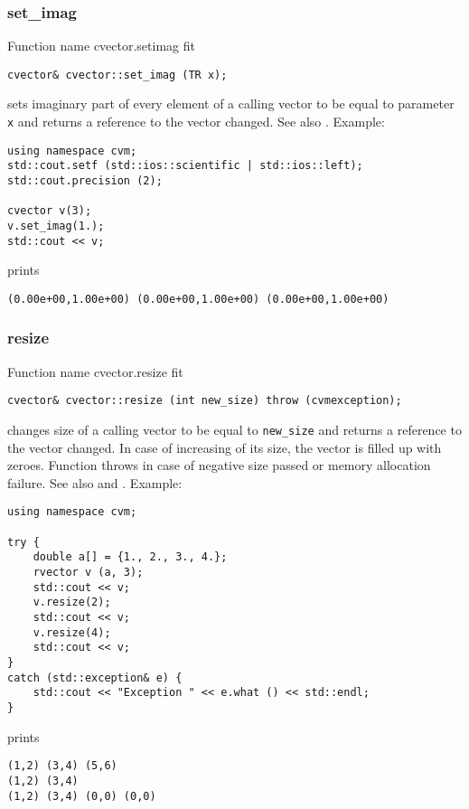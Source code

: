 \subsubsection{set\_imag}
Function%
\pdfdest name {cvector.setimag} fit
\begin{verbatim}
cvector& cvector::set_imag (TR x);
\end{verbatim}
sets imaginary part of every element of a calling vector to be equal to
parameter \verb"x"
and returns a reference to the vector changed.
See also .
Example:
\begin{Verbatim}
using namespace cvm;
std::cout.setf (std::ios::scientific | std::ios::left);
std::cout.precision (2);

cvector v(3);
v.set_imag(1.);
std::cout << v;
\end{Verbatim}
prints
\begin{Verbatim}
(0.00e+00,1.00e+00) (0.00e+00,1.00e+00) (0.00e+00,1.00e+00)
\end{Verbatim}
\newpage


\subsubsection{resize}
Function%
\pdfdest name {cvector.resize} fit
\begin{verbatim}
cvector& cvector::resize (int new_size) throw (cvmexception);
\end{verbatim}
changes  size of a calling vector to be equal to
\verb"new_size" and returns a reference to
the vector changed.
In case of increasing of its size, the vector
is filled up with zeroes.
Function throws  
in case of negative size passed or memory allocation failure.
See also  and
.
Example:
\begin{Verbatim}
using namespace cvm;

try {
    double a[] = {1., 2., 3., 4.};
    rvector v (a, 3);
    std::cout << v;
    v.resize(2);
    std::cout << v;
    v.resize(4);
    std::cout << v;
}
catch (std::exception& e) {
    std::cout << "Exception " << e.what () << std::endl;
}
\end{Verbatim}
prints
\begin{Verbatim}
(1,2) (3,4) (5,6)
(1,2) (3,4)
(1,2) (3,4) (0,0) (0,0)
\end{Verbatim}
\newpage


